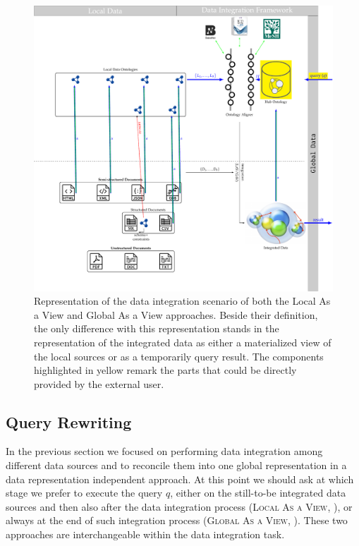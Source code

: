 

\begin{figure}[!t]
	\centering
	\includegraphics[width=\textwidth]{fig/01dataint/LAV}
	\caption{Representation of the data integration scenario of both the Local As a View and Global As a View approaches. Beside their definition, the only difference with this representation stands in the representation of the integrated data as either a materialized view of the local sources or as a temporarily query result. The components highlighted in yellow remark the parts that could be directly provided by the external user.}
	\label{fig:lavgav}
\end{figure}
\subsection{Query Rewriting}\label{subsec:queryrw}
In the previous section we focused on performing data integration among different data sources and to reconcile them into one global representation in a data representation independent approach. At this point we should ask at  which stage we prefer to execute the query $q$, either on the still-to-be integrated data sources and then also after the data integration process (\textsc{Local As a View}, \cite{ManolescuFK01,Nadal0AVV17,SintSSF09}), or always at the end of such integration process (\textsc{Global As a View}, \cite{magnani04,Magnani06,Lu2006,BotoevaCCRX16}). These two approaches are interchangeable within the data integration task.

